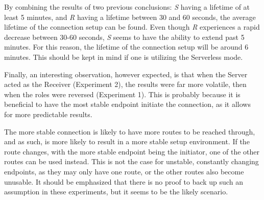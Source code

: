 By combining the results of two previous conclusions: \textit{S} having a lifetime of at least 5 minutes, and \textit{R} having a lifetime between 30 and 60 seconds, the average lifetime of the connection setup can be found. Even though \textit{R} experiences a rapid decrease between 30-60 seconds, \textit{S} seems to have the ability to extend past 5 minutes. For this reason, the lifetime of the connection setup will be around 6 minutes. This should be kept in mind if one is utilizing the Serverless mode.

Finally, an interesting observation, however expected, is that when the Server acted as the Receiver (Experiment 2), the results were far more volatile, then when the roles were reversed (Experiment 1). This is probably because it is beneficial to have the most stable endpoint initiate the connection, as it allows for more predictable results.

The more stable connection is likely to have more routes to be reached through, and as such, is more likely to result in a more stable setup environment. If the route changes, with the more stable endpoint being the initiator, one of the other routes can be used instead. This is not the case for unstable, constantly changing endpoints, as they may only have one route, or the other routes also become unusable. It should be emphasized that there is no proof to back up such an assumption in these experiments, but it seems to be the likely scenario.
%
